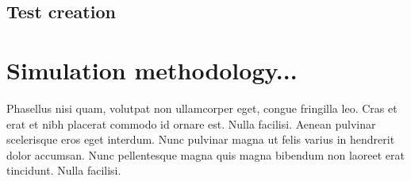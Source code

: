 \subsection{Test creation}


\section{Simulation methodology...}

Phasellus nisi quam, volutpat non ullamcorper eget, congue fringilla leo. Cras et erat et nibh placerat commodo id ornare est. Nulla facilisi. Aenean pulvinar scelerisque eros eget interdum. Nunc pulvinar magna ut felis varius in hendrerit dolor accumsan. Nunc pellentesque magna quis magna bibendum non laoreet erat tincidunt. Nulla facilisi.
